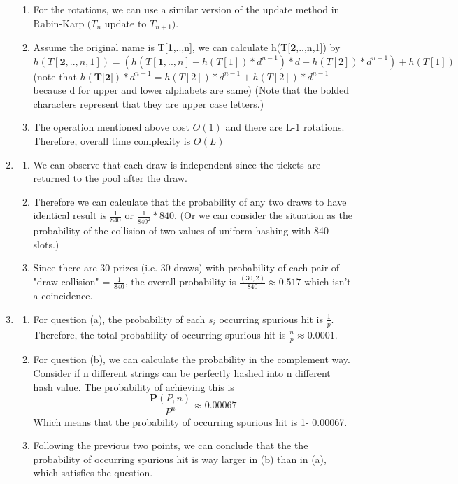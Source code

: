 \documentclass{article}
\begin{document}
\begin{CJK*}{UTF8}{bsmi}
\begin{enumerate}
\begin{enumerate}
        \item For the rotations, we can use a similar version of the update method in Rabin-Karp $(T_n$ update to $T_{n+1})$. 
        \item Assume the original name is T[\textbf{1},..,n], we can calculate h(T[\textbf{2},..,n,1]) by $h(T[\textbf{2},..,n,1]) = (h(T[\textbf{1},..,n] - h(T[1])*d^{n-1}) * d + h(T[2])*d^{n-1}) + h(T[1])$ (note that  $h(\textbf{T[2]})*d^{n-1} = h(T[2])*d^{n-1} + h(T[2])*d^{n-1}$ because d for upper and lower alphabets are same) (Note that the bolded characters represent that they are upper case letters.)
        \item The operation mentioned above cost $O(1)$ and there are L-1 rotations. Therefore, overall time complexity is $O(L)$
    \end{enumerate}
    \item \begin{enumerate}
        \item We can observe that each draw is independent since the tickets are returned to the pool after the draw.
        \item Therefore we can calculate that the probability of any two draws to have identical result is $\frac{1}{840}$ or $\frac{1}{840^2} *840$. (Or we can consider the situation as the probability of the collision of two values of uniform hashing with 840 slots.)
        \item Since there are 30 prizes (i.e. 30 draws) with probability of each pair of "draw collision" = $\frac{1}{840}$, the overall probability is $\frac{(30,2)}{840} \approx 0.517$ which isn't a coincidence.
    \end{enumerate}    
    \item \begin{enumerate}
        \item For question (a), the probability of each $s_i$ occurring spurious hit is $\frac{1}{p}$. Therefore, the total probability of occurring spurious hit is $\frac{n}{p} \approx 0.0001$.
        \item For question (b), we can calculate the probability in the complement way. Consider if n different strings can be perfectly hashed into n different hash value. The probability of achieving this is 
        \[ \frac{\textbf{P}(P,n)}{P^n} \approx 0.00067\]
        Which means that the probability of occurring spurious hit is 1- 0.00067.
        \item Following the previous two points, we can conclude that the the probability of occurring spurious hit is way larger in (b) than in (a), which satisfies the question.
    \end{enumerate}
\end{enumerate}


\end{CJK*}
\end{document}

